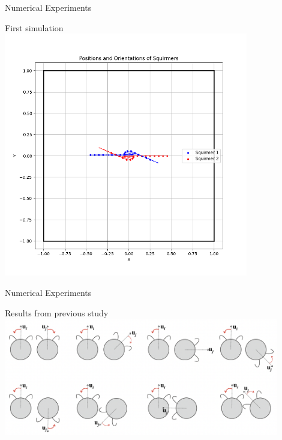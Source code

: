 \documentclass{beamer}
\begin{document}
    

\begin{frame}{Numerical Experiments}
    \begin{center}
        First simulation
        \includegraphics[width=0.8\textwidth]{../../graphs/squirmers_colliding.png}
    \end{center}
\end{frame}

\begin{frame}{Numerical Experiments}
    \begin{center}
        Results from previous study \cite{Stark}
        \includegraphics[width=0.9\textwidth]{../images/stark_behavior.png}
        \cite{Stark}
    \end{center}
\end{frame}
\end{document}
